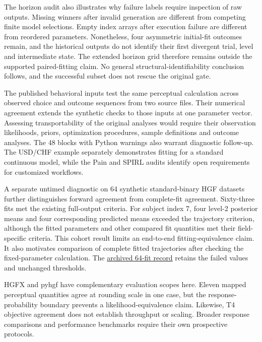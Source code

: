 \documentclass[
  11pt,
]{article}
\begin{document}
The horizon audit also illustrates why failure labels require inspection
of raw outputs. Missing winners after invalid generation are different
from competing finite model selections. Empty index arrays after
execution failure are different from reordered parameters. Nonetheless,
four asymmetric initial-fit outcomes remain, and the historical outputs
do not identify their first divergent trial, level and intermediate
state. The extended horizon grid therefore remains outside the supported
paired-fitting claim. No general structural-identifiability conclusion
follows, and the successful subset does not rescue the original gate.

The published behavioral inputs test the same perceptual calculation
across observed choice and outcome sequences from two source files.
Their numerical agreement extends the synthetic checks to those inputs
at one parameter vector. Assessing transportability of the original
analyses would require their observation likelihoods, priors,
optimization procedures, sample definitions and outcome analyses. The 48
blocks with Python warnings also warrant diagnostic follow-up. The
USD/CHF example separately demonstrates fitting for a standard
continuous model, while the Pain and SPIRL audits identify open
requirements for customized workflows.

A separate untimed diagnostic on 64 synthetic standard-binary HGF
datasets further distinguishes forward agreement from complete-fit
agreement. Sixty-three fits met the existing full-output criteria. For
subject index 7, four level-2 posterior means and four corresponding
predicted means exceeded the trajectory criterion, although the fitted
parameters and other compared fit quantities met their field-specific
criteria. This cohort result limits an end-to-end fitting-equivalence
claim. It also motivates comparison of complete fitted trajectories
after checking the fixed-parameter calculation. The
\href{https://github.com/ahmadkhanloo/hgfx/blob/81d9e8fc67c1d801f7d749cf44ba9fcfffdbf1f3/benchmarks/runtime_v1/fit_cohort_results/summary-41863441006.json}{archived
64-fit record} retains the failed values and unchanged thresholds.

HGFX and pyhgf have complementary evaluation scopes here. Eleven mapped
perceptual quantities agree at rounding scale in one case, but the
response-probability boundary prevents a likelihood-equivalence claim.
Likewise, T4 objective agreement does not establish throughput or
scaling. Broader response comparisons and performance benchmarks require
their own prospective protocols.
\end{document}
